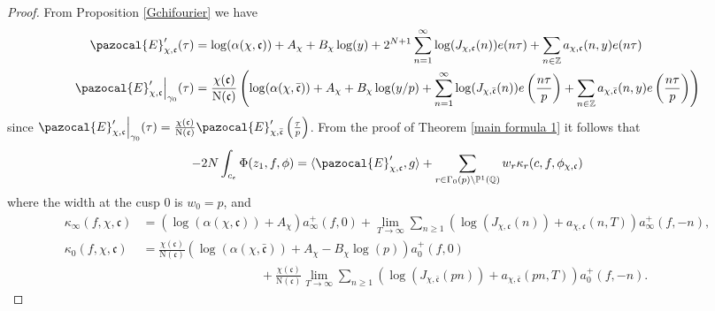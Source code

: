 \documentclass[twoside,a4paper,10pt]{article} %
\newcommand{\8}{\infty}
\newcommand{\Z}{\mathbb{Z}}
\newcommand{\Q}{\mathbb{Q}}
\newcommand{\PP}{\mathbb{P}}
\newcommand{\cfrak}{\mathfrak{c}}
\newcommand{\N}{\mathrm{N}}
\newcommand{\Ecal}{\pazocal{E}}
\newcommand\restr[2]{{%
  \left.\kern-\nulldelimiterspace %
  #1 %
  \vphantom{\big|} %
  \right|_{#2} %
  }}
\theoremstyle{mytheoremstyle}
\theoremstyle{remark}
\numberwithin{equation}{section}
\begin{document}
\begin{proof}  From Proposition \ref{Gchifourier} we have 
\begin{align}
\Ecal'_{\chi,\cfrak}(\tau)&= \log(\alpha(\chi,\cfrak))+A_{\chi}+B_{\chi}\log(y)+2^{N+1} \sum_{n=1}^\8\log(J_{\chi,\cfrak}(n))e(n \tau)  + \sum_{n \in \Z} a_{\chi,\cfrak}(n,y)e(n \tau) \\
\restr{\Ecal'_{\chi,\cfrak}}{\gamma_0}(\tau) &= \frac{\chi(\cfrak)}{\N(\cfrak)} \left ( \log(\alpha(\chi,\bar{\cfrak}))+A_{\chi}+B_{\chi}\log(y/p)+ \sum_{n=1}^\8\log(J_{\chi,\bar{\cfrak}}(n))e\left ( \frac{n\tau}{p} \right )  + \sum_{n \in \Z} a_{\chi,\bar{\cfrak}}(n,y)e\left ( \frac{n\tau}{p} \right ) \right )
\end{align}
since $\restr{\Ecal'_{\chi,\cfrak}}{\gamma_0}(\tau)=\frac{\chi(\cfrak)}{\N(\cfrak)}\Ecal'_{\chi,\bar{\cfrak}}\left (\frac{\tau}{p} \right )$. From the proof of Theorem \ref{main formula 1} it follows that
\begin{align}
-2N\int_{c_\epsilon}\Phi(z_1,f,\phi) =  \langle \Ecal'_{\chi,\cfrak},g \rangle+\sum_{ r \in \Gamma_0(p) \backslash \PP^1(\Q)}w_r \kappa_r(c,f,\phi_{\chi,\cfrak})
\end{align}
where the width at the cusp $0$ is $w_0=p$, and
\begin{align}
\kappa_\8(f,\chi,\cfrak)& =\left ( \log(\alpha(\chi,\cfrak)) +A_{\chi} \right )a^+_\8(f,0)  + \lim_{T \rightarrow \8}\sum_{n \geq 1} \left (\log(J_{\chi,\cfrak}(n))+a_{\chi,\cfrak}(n,T)\right )  a^+_\8(f,-n), \\
\kappa_0(f,\chi,\cfrak)& =\frac{\chi(\cfrak)}{\N(\cfrak)} \left ( \log(\alpha(\chi,\bar{\cfrak})) +A_{\chi} -B_\chi \log(p) \right )a^+_0(f,0)   \\
& \hspace{4cm} + \frac{\chi(\cfrak)}{\N(\cfrak)} \lim_{T \rightarrow \8}\sum_{n \geq 1} \left ( \log(J_{\chi,\bar{\cfrak}}(pn))+a_{\chi,\bar{\cfrak}}(pn,T)\right )  a^+_0(f,-n).
\end{align}


\end{proof}
\end{document}
